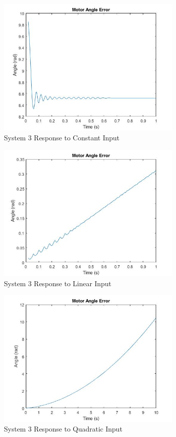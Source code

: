 \begin{figure}[H]
        \centering
        \includegraphics[width=0.8\textwidth]{./figures/lab4_fig13-part4-3-3-error-rc-D=1-constant.jpg}
        \caption{System 3 Response to Constant Input}
        \label{fig:system3_constant}
\end{figure}

\begin{figure}[H]
        \centering
        \includegraphics[width=0.8\textwidth]{./figures/lab4_fig14-part4-3-3-error-rc-D=1-linear.jpg}
        \caption{System 3 Response to Linear Input}
        \label{fig:system3_linear}
\end{figure}

\begin{figure}[H]
        \centering
        \includegraphics[width=0.8\textwidth]{./figures/lab4_fig15-part4-3-3-error-rc-D=1-quadratic.jpg}
        \caption{System 3 Response to Quadratic Input}
        \label{fig:system3_quadratic}
\end{figure}
